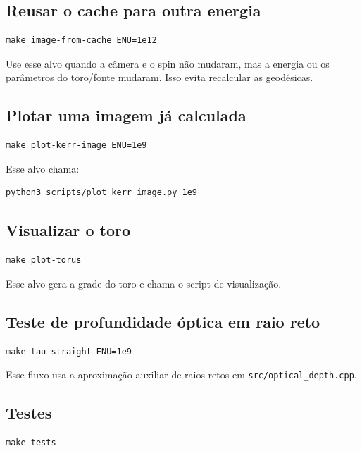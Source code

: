 \documentclass[11pt,a4paper]{article}
\begin{document}
\subsection{Reusar o cache para outra energia}

\begin{verbatim}
make image-from-cache ENU=1e12
\end{verbatim}

Use esse alvo quando a câmera e o spin não mudaram, mas a energia ou os
parâmetros do toro/fonte mudaram. Isso evita recalcular as geodésicas.

\subsection{Plotar uma imagem já calculada}

\begin{verbatim}
make plot-kerr-image ENU=1e9
\end{verbatim}

Esse alvo chama:

\begin{verbatim}
python3 scripts/plot_kerr_image.py 1e9
\end{verbatim}

\subsection{Visualizar o toro}

\begin{verbatim}
make plot-torus
\end{verbatim}

Esse alvo gera a grade do toro e chama o script de visualização.

\subsection{Teste de profundidade óptica em raio reto}

\begin{verbatim}
make tau-straight ENU=1e9
\end{verbatim}

Esse fluxo usa a aproximação auxiliar de raios retos em
\texttt{src/optical\_depth.cpp}.

\subsection{Testes}

\begin{verbatim}
make tests
\end{verbatim}
\end{document}
